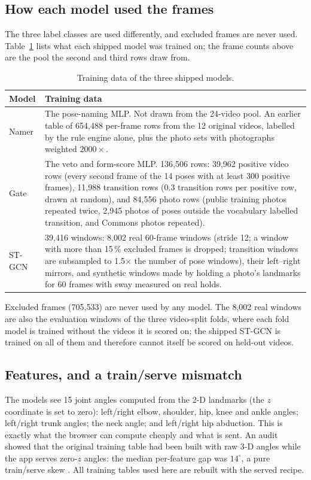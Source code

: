 \subsection{How each model used the frames}\label{sec:frameuse}
The three label classes are used differently, and excluded frames are never used. Table~\ref{tab:frameuse} lists what each shipped model was trained on; the frame counts above are the pool the second and third rows draw from.
\begin{table}[t]
\centering\footnotesize
\caption{Training data of the three shipped models.}\label{tab:frameuse}
\begin{tabularx}{\columnwidth}{@{}p{1.2cm}X@{}}
\toprule
Model & Training data \\ \midrule
Namer & The pose-naming MLP. Not drawn from the 24-video pool. An earlier table of 654{,}488 per-frame rows from the 12 original videos, labelled by the rule engine alone, plus the photo sets with photographs weighted $2000\times$. \\
Gate & The veto and form-score MLP. 136{,}506 rows: 39{,}962 positive video rows (every second frame of the 14 poses with at least 300 positive frames), 11{,}988 transition rows (0.3 transition rows per positive row, drawn at random), and 84{,}556 photo rows (public training photos repeated twice, 2{,}945 photos of poses outside the vocabulary labelled transition, and Commons photos repeated). \\
ST-GCN & 39{,}416 windows: 8{,}002 real 60-frame windows (stride 12; a window with more than 15\,\% excluded frames is dropped; transition windows are subsampled to 1.5$\times$ the number of pose windows), their left--right mirrors, and synthetic windows made by holding a photo's landmarks for 60 frames with sway measured on real holds. \\ \bottomrule
\end{tabularx}
\end{table}
Excluded frames (705{,}533) are never used by any model. The 8{,}002 real windows are also the evaluation windows of the three video-split folds, where each fold model is trained without the videos it is scored on; the shipped ST-GCN is trained on all of them and therefore cannot itself be scored on held-out videos.

\subsection{Features, and a train/serve mismatch}\label{sec:features}
The models see 15 joint angles computed from the 2-D landmarks (the $z$ coordinate is set to zero): left/right elbow, shoulder, hip, knee and ankle angles; left/right trunk angles; the neck angle; and left/right hip abduction. This is exactly what the browser can compute cheaply and what is sent. An audit showed that the original training table had been built with raw 3-D angles while the app serves zero-$z$ angles: the median per-feature gap was $14^\circ$, a pure train/serve skew \cite{sculley2015debt}. All training tables used here are rebuilt with the served recipe.


